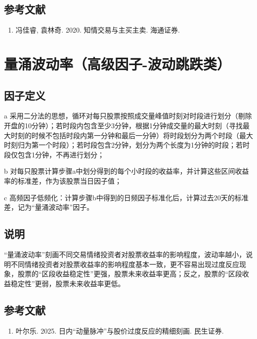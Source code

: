 \documentclass{article}
\begin{document}
\subsection{参考文献}
\begin{enumerate}
    \item 冯佳睿, 袁林奇. 2020. 知情交易与主买主卖. 海通证券.
\end{enumerate}

\section{量涌波动率（高级因子-波动跳跌类）}

\subsection{因子定义}

a 采用二分法的思想，循环对每只股票按照成交量峰值时刻对时段进行划分（剔除开盘的10分钟）；若时段内包含至少3分钟，根据1分钟成交量的最大时刻（寻找最大时刻的时候不包括时段内第一分钟和最后一分钟）将时段划分为两个时段（最大时刻归为第一个时段）；若时段包含2分钟，划分为两个长度为1分钟的时段；若时段仅包含1分钟，不再进行划分；

b 对每只股票计算步骤a中划分得到的每个小时段的收益率，并计算这些区间收益率的标准差，作为该股票当日因子值；

c 高频因子低频化：计算步骤b中得到的日频因子标准化后，计算过去20天的标准差，记为“量涌波动率”因子。

\subsection{说明}
“量涌波动率”刻画不同交易情绪投资者对股票收益率的影响程度，波动率越小，说明不同情绪投资者对股票收益率的影响程度基本一致，更不容易出现过度反应现象，股票的“区段收益稳定性”更强，股票未来收益率更高；反之，股票的“区段收益稳定性”更弱，股票未来收益率更低。

\subsection{参考文献}
\begin{enumerate}
    \item 叶尔乐. 2025. 日内“动量脉冲”与股价过度反应的精细刻画. 民生证券.
\end{enumerate}
\end{document}
